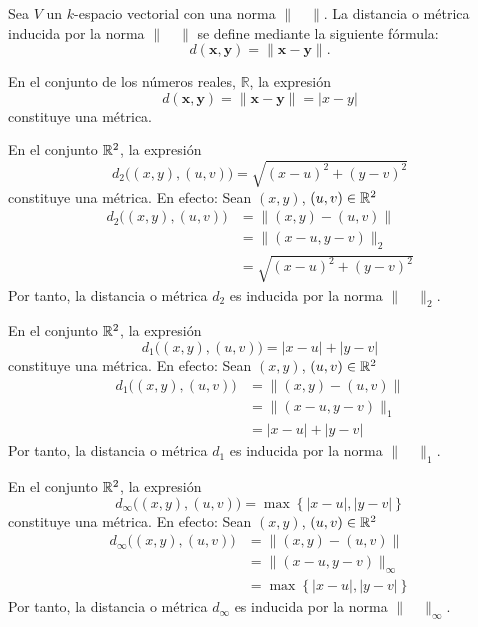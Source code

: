 \begin{definition}
    Sea $V$ un $k$-espacio vectorial con una norma $\| \quad \|$. La distancia o métrica inducida por la norma $\| \quad \|$ se define mediante la siguiente fórmula:
    $$d(\mathbf{x}, \mathbf{y}) = \| \mathbf{x} - \mathbf{y} \|.$$
\end{definition}

\begin{example}
    En el conjunto de los números reales, $\mathbb{R}$, la expresión
    $$d(\mathbf{x}, \mathbf{y}) = \| \mathbf{x} - \mathbf{y} \| = |x - y|$$
    constituye una métrica.
\end{example}

\begin{example}
    En el conjunto $\RR[2]$, la expresión
    $$d_2\big( (x, y), (u, v) \big) = \sqrt{(x - u)^2 + (y - v)^2}$$
    constituye una métrica. En efecto: Sean $(x, y)$, $(u, v) \in \RR[2]$
    \begin{align*}
        d_2\big( (x, y), (u, v) \big) & = \| (x, y) - (u, v) \| \\
        & = \| (x - u, y - v) \|_2 \\
        & = \sqrt{(x - u)^2 + (y - v)^2}
    \end{align*}
    Por tanto, la distancia o métrica $d_2$ es inducida por la norma $\| \quad \|_2$.
\end{example}

\begin{example}
    En el conjunto $\RR[2]$, la expresión
    $$d_1\big( (x, y), (u, v) \big) = |x - u| + |y - v|$$
    constituye una métrica. En efecto: Sean $(x, y)$, $(u, v) \in \RR[2]$
    \begin{align*}
        d_1\big( (x, y), (u, v) \big) & = \| (x, y) - (u, v) \| \\
        & = \| (x - u, y - v) \|_1 \\
        & = |x - u| + |y - v|
    \end{align*}
    Por tanto, la distancia o métrica $d_1$ es inducida por la norma $\| \quad \|_1$.
\end{example}

\begin{example}
    En el conjunto $\RR[2]$, la expresión
    $$d_{\infty}\big( (x, y), (u, v) \big) = \max \left\{ |x - u|, |y - v| \right\}$$
    constituye una métrica. En efecto: Sean $(x, y)$, $(u, v) \in \RR[2]$
    \begin{align*}
        d_{\infty}\big( (x, y), (u, v) \big) & = \| (x, y) - (u, v) \| \\
        & = \| (x - u, y - v) \|_{\infty} \\
        & = \max \left\{ |x - u|, |y - v| \right\}
    \end{align*}
    Por tanto, la distancia o métrica $d_{\infty}$ es inducida por la norma $\| \quad \|_{\infty}$.
\end{example}

